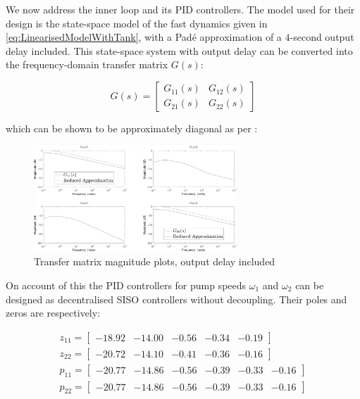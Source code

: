 We now address the inner loop and its PID controllers. The model used for their design is the state-space model of the fast dynamics given in \cref{eq:LinearisedModelWithTank}, with a Padé approximation of a $4$-second output delay included. This state-space system with output delay can be converted into the frequency-domain transfer matrix $G(s)$:

\begin{equation}\label{eq:TransferMatrix}
	G(s) = \begin{bmatrix} G_{11}(s) & G_{12}(s) \\ G_{21}(s) & G_{22}(s)\end{bmatrix}
\end{equation}

which can be shown to be approximately diagonal as per :

\begin{figure}[h!]
 	\centering
 	\includegraphics[width=\linewidth,height=4cm]{Graphics/PumpMagPlot.pdf}
 	\caption{Transfer matrix magnitude plots, output delay included}
 	\label{fig:BodeMagDelayPlot}
\end{figure}

On account of this the PID controllers for pump speeds $\omega_1$ and $\omega_2$ can be designed as decentralised SISO controllers without decoupling. Their poles and zeros are respectively:

\begin{equation}\label{eq:PumpTFNumDen}
	\begin{gathered}
		z_{11} = \begin{bmatrix}-18.92 & -14.00 & -0.56 & -0.34 & -0.19	\end{bmatrix} \\
		z_{22} = \begin{bmatrix}-20.72 & -14.10 & -0.41 & -0.36 & -0.16	\end{bmatrix} \\
		p_{11} = \begin{bmatrix}-20.77 & -14.86 & -0.56 & -0.39 & -0.33 & -0.16\end{bmatrix} \\
		p_{22} = \begin{bmatrix}-20.77 & -14.86 & -0.56 & -0.39 & -0.33 & -0.16\end{bmatrix}
	\end{gathered}
\end{equation}

